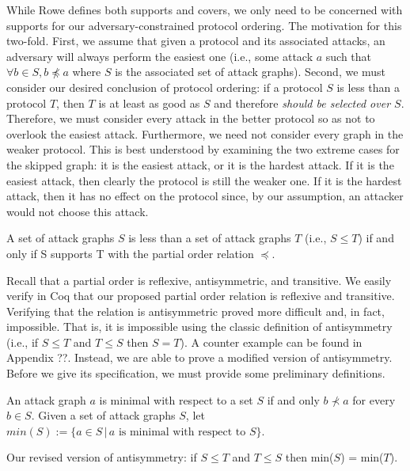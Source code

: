 \documentclass[runningheads]{llncs}
\theoremstyle{definition}
\begin{document}
While Rowe defines both supports and covers, we only need to be concerned with supports for our adversary-constrained protocol ordering. The motivation for this two-fold. First, we assume that given a protocol and its associated attacks, an adversary will always perform the easiest one (i.e., some attack $a$ such that $\forall b \in S, b \npreceq a$ where $S$ is the associated set of attack graphs). Second, we must consider our desired conclusion of protocol ordering: if a protocol $S$ is less than a protocol $T$, then $T$ is at least as good as $S$ and therefore \emph{should be selected over $S$}. Therefore, we must consider every attack in the better protocol so as not to overlook the easiest attack. Furthermore, we need not consider every graph in the weaker protocol. This is best understood by examining the two extreme cases for the skipped graph: it is the easiest attack, or it is the hardest attack. If it is the easiest attack, then clearly the protocol is still the weaker one. If it is the hardest attack, then it has no effect on the protocol since, by our assumption, an attacker would not choose this attack.

\begin{definition}
  A set of attack graphs $S$ is less than a set of attack graphs $T$ (i.e., $S \leq T$) if and only if S supports T with the partial order relation $\preceq$.
\end{definition}

Recall that a partial order is reflexive, antisymmetric, and transitive. We easily verify in Coq that our proposed partial order relation is reflexive and transitive. Verifying that the relation is antisymmetric proved more difficult and, in fact, impossible. That is, it is impossible using the classic definition of antisymmetry (i.e., if $S \le T$ and $T \le S$ then $S = T$). A counter example can be found in Appendix ??. Instead, we are able to prove a modified version of antisymmetry. Before we give its specification, we must provide some preliminary definitions.

\begin{definition}
  An attack graph $a$ is minimal with respect to a set $S$ if and only $b \nprec a$ for every $b \in S$. Given a set of attack graphs $S$, let $min(S) := \{a \in S \,|\, a \text{ is minimal with respect to } S \}$.
\end{definition}

Our revised version of antisymmetry: if $S \le T$ and $T \le S$ then min($S$) = min($T$).
\end{document}
